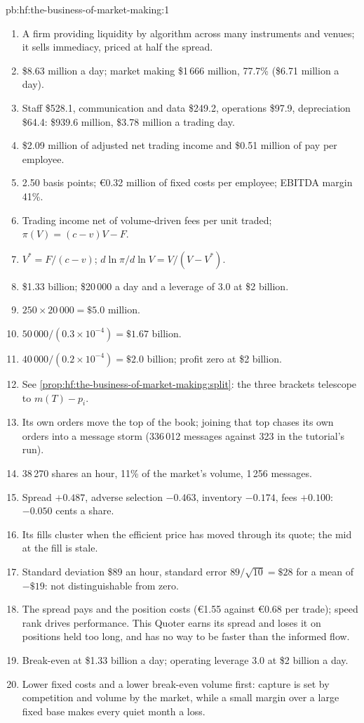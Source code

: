 \begin{solution}{pb:hf:the-business-of-market-making:1}
\begin{enumerate}
\item A firm providing liquidity by algorithm across many instruments and venues; it sells immediacy, priced at half the spread.
\item \$8.63 million a day; market making \$1\,666 million, 77.7\% (\$6.71 million a day).
\item Staff \$528.1, communication and data \$249.2, operations \$97.9, depreciation \$64.4: \$939.6 million, \$3.78 million a trading day.
\item \$2.09 million of adjusted net trading income and \$0.51 million of pay per employee.
\item 2.50 basis points; \euro0.32 million of fixed costs per employee; EBITDA margin 41\%.
\item Trading income net of volume-driven fees per unit traded; $\pi(V)=(c-v)V-F$.
\item $V^\ast=F/(c-v)$; $d\ln\pi/d\ln V=V/(V-V^\ast)$.
\item \$1.33 billion; \$20\,000 a day and a leverage of 3.0 at \$2 billion.
\item $250\times20\,000=\$5.0$ million.
\item $50\,000/(0.3\times10^{-4})=\$1.67$ billion.
\item $40\,000/(0.2\times10^{-4})=\$2.0$ billion; profit zero at \$2 billion.
\item See \cref{prop:hf:the-business-of-market-making:split}: the three brackets telescope to $m(T)-p_i$.
\item Its own orders move the top of the book; joining that top chases its own orders into a message storm (336\,012 messages against 323 in the
tutorial's run).
\item 38\,270 shares an hour, 11\% of the market's volume, 1\,256 messages.
\item Spread $+0.487$, adverse selection $-0.463$, inventory $-0.174$, fees $+0.100$: $-0.050$ cents a share.
\item Its fills cluster when the efficient price has moved through its quote; the mid at the fill is stale.
\item Standard deviation \$89 an hour, standard error $89/\sqrt{10}=\$28$ for a mean of $-\$19$: not distinguishable from zero.
\item The spread pays and the position costs (\euro1.55 against \euro0.68 per trade); speed rank drives performance. This Quoter earns its spread and
loses it on positions held too long, and has no way to be faster than the informed flow.
\item Break-even at \$1.33 billion a day; operating leverage 3.0 at \$2 billion a day.
\item Lower fixed costs and a lower break-even volume first: capture is set by competition and volume by the market, while a small margin over a
large fixed base makes every quiet month a loss.
\end{enumerate}
\end{solution}

